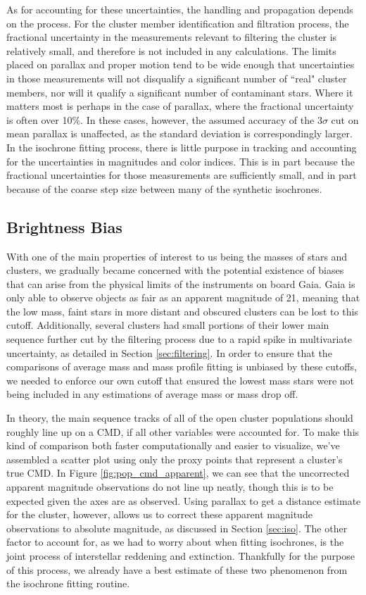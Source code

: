 \documentclass[onecolumn,table,xcdraw,super]{aastex631}
\begin{document}
As for accounting for these uncertainties, the handling and propagation depends on the process. For the cluster member identification and filtration process, the fractional uncertainty in the measurements relevant to filtering the cluster is relatively small, and therefore is not included in any calculations. The limits placed on parallax and proper motion tend to be wide enough that uncertainties in those measurements will not disqualify a significant number of ``real" cluster members, nor will it qualify a significant number of contaminant stars. Where it matters most is perhaps in the case of parallax, where the fractional uncertainty is often over 10\%. In these cases, however, the assumed accuracy of the $3\sigma$ cut on mean parallax is unaffected, as the standard deviation is correspondingly larger. In the isochrone fitting process, there is little purpose in tracking and accounting for the uncertainties in magnitudes and color indices. This is in part because the fractional uncertainties for those measurements are sufficiently small, and in part because of the coarse step size between many of the synthetic isochrones.


\subsection{Brightness Bias} \label{sec:bias}

With one of the main properties of interest to us being the masses of stars and clusters, we gradually became concerned with the potential existence of biases that can arise from the physical limits of the instruments on board Gaia. Gaia is only able to observe objects as fair as an apparent magnitude of 21, meaning that the low mass, faint stars in more distant and obscured clusters can be lost to this cutoff. Additionally, several clusters had small portions of their lower main sequence further cut by the filtering process due to a rapid spike in multivariate uncertainty, as detailed in Section \ref{sec:filtering}. In order to ensure that the comparisons of average mass and mass profile fitting is unbiased by these cutoffs, we needed to enforce our own cutoff that ensured the lowest mass stars were not being included in any estimations of average mass or mass drop off.

In theory, the main sequence tracks of all of the open cluster populations should roughly line up on a CMD, if all other variables were accounted for. To make this kind of comparison both faster computationally and easier to visualize, we've assembled a scatter plot using only the proxy points that represent a cluster's true CMD. In Figure \ref{fig:pop_cmd_apparent}, we can see that the uncorrected apparent magnitude observations do not line up neatly, though this is to be expected given the axes are as observed. Using parallax to get a distance estimate for the cluster, however, allows us to correct these apparent magnitude observations to absolute magnitude, as discussed in Section \ref{sec:iso}. The other factor to account for, as we had to worry about when fitting isochrones, is the joint process of interstellar reddening and extinction. Thankfully for the purpose of this process, we already have a best estimate of these two phenomenon from the isochrone fitting routine. 
\end{document}
